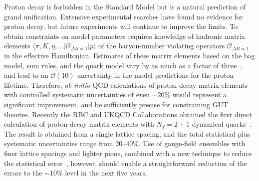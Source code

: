 \begin{itemize}
Proton decay is forbidden in the Standard Model but is a natural prediction of grand unification.
Extensive experimental searches have found no evidence for proton decay, but future experiments
will continue to improve the limits.
To obtain constraints on model parameters requires knowledge of hadronic matrix elements
$\langle\pi,K,\eta,\ldots|\mathcal{O}_{\Delta B=1} | p \rangle$ of the baryon-number violating operators
$\mathcal{O}_{\Delta B=1}$ in the effective Hamiltonian.
Estimates of these matrix elements based on the bag model, sum rules, and the quark model vary by as much as a factor of three~\cite{Ioffe:1981kw,Claudson:1981gh,Donoghue:1982jm,Martin:2011nd}, and lead to an ${\mathcal O}(10)$ uncertainty in the model predictions for the proton
lifetime. Therefore, \emph{ab initio} QCD calculations of proton-decay matrix elements with controlled systematic
uncertainties of even $\sim 20\%$ would represent a significant improvement, and be sufficiently precise for
constraining GUT theories. Recently the RBC and UKQCD Collaborations obtained the first direct calculation of proton-decay matrix
elements with $N_f=2+1$ dynamical quarks~\cite{Aoki:2013yxa}.
The result is obtained from a single lattice spacing, and the total statistical plus systematic uncertainties
range from 20--40\%.
Use of gauge-field ensembles with finer lattice spacings and lighter pions, combined with a new technique to
reduce the statistical error~\cite{Blum:2012uh}, however, should enable a straightforward reduction of the
errors to the $\sim 10\%$ level in the next five years.


\end{itemize}
